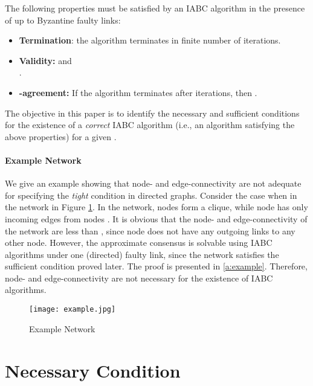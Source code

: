 \documentclass{llncs}
\begin{document}
The following properties must be satisfied by an IABC algorithm
in the presence of up to  Byzantine faulty links:
\begin{itemize}
\item {\bf Termination}: the algorithm terminates in finite number of iterations.\\

\item {\bf Validity:} 
 and \\
.\\

\item {\bf -agreement:} If the algorithm terminates after  iterations, then .
\end{itemize}
The objective in this paper is to identify the necessary and sufficient
conditions for the existence of a {\em correct} IABC algorithm (i.e.,
an algorithm satisfying the above properties) for a given .




\paragraph{Example Network}

We give an example showing that node- and edge-connectivity are not adequate for specifying the {\em tight} condition in directed graphs. Consider the case when  in the network in Figure \ref{f:eg}. In the network, nodes  form a clique, while node  has only incoming edges from nodes . It is obvious that the node- and edge-connectivity of the network are less than , since node  does not have any outgoing links to any other node. However, the approximate consensus is solvable using IABC algorithms under one (directed) faulty link, since the network satisfies the sufficient condition proved later. The proof is presented in \ref{a:example}. Therefore,  node- and edge-connectivity are not necessary for the existence of IABC algorithms.

\begin{figure}[hbt!]
\centering
\texttt{[image: example.jpg]}
\vspace*{-10pt}
\caption{Example Network}
\label{f:eg}
\end{figure}


\section{Necessary Condition}
\label{s_necessary}
\end{document}
